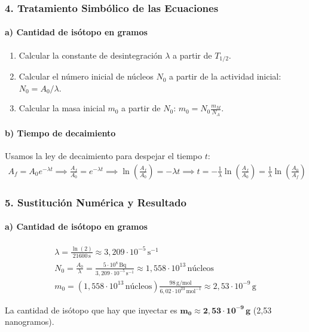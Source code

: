 \subsubsection*{4. Tratamiento Simbólico de las Ecuaciones}
\paragraph{a) Cantidad de isótopo en gramos}
\begin{enumerate}
    \item Calcular la constante de desintegración $\lambda$ a partir de $T_{1/2}$.
    \item Calcular el número inicial de núcleos $N_0$ a partir de la actividad inicial: $N_0 = A_0/\lambda$.
    \item Calcular la masa inicial $m_0$ a partir de $N_0$: $m_0 = N_0 \frac{m_M}{N_A}$.
\end{enumerate}
\paragraph{b) Tiempo de decaimiento}
Usamos la ley de decaimiento para despejar el tiempo $t$:
\begin{gather}
    A_f = A_0 e^{-\lambda t} \implies \frac{A_f}{A_0} = e^{-\lambda t} \implies \ln\left(\frac{A_f}{A_0}\right) = -\lambda t \implies t = -\frac{1}{\lambda}\ln\left(\frac{A_f}{A_0}\right) = \frac{1}{\lambda}\ln\left(\frac{A_0}{A_f}\right)
\end{gather}

\subsubsection*{5. Sustitución Numérica y Resultado}
\paragraph{a) Cantidad de isótopo en gramos}
\begin{gather}
    \lambda = \frac{\ln(2)}{21600\,\text{s}} \approx 3,209 \cdot 10^{-5}\,\text{s}^{-1} \\
    N_0 = \frac{A_0}{\lambda} = \frac{5 \cdot 10^8\,\text{Bq}}{3,209 \cdot 10^{-5}\,\text{s}^{-1}} \approx 1,558 \cdot 10^{13}\,\text{núcleos} \\
    m_0 = (1,558 \cdot 10^{13}\,\text{núcleos}) \frac{98\,\text{g/mol}}{6,02 \cdot 10^{23}\,\text{mol}^{-1}} \approx 2,53 \cdot 10^{-9}\,\text{g}
\end{gather}
\begin{cajaresultado}
    La cantidad de isótopo que hay que inyectar es $\boldsymbol{m_0 \approx 2,53 \cdot 10^{-9}\,\textbf{g}}$ (2,53 nanogramos).
\end{cajaresultado}

